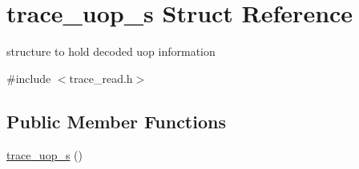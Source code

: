 \hypertarget{structtrace__uop__s}{
\section{trace\_\-uop\_\-s Struct Reference}
\label{structtrace__uop__s}
}


structure to hold decoded uop information  




{\ttfamily \#include $<$trace\_\-read.h$>$}

\subsection*{Public Member Functions}
\begin{DoxyCompactItemize}
\item 
\hyperlink{structtrace__uop__s_a9ca5a26d83c20695506e4eec07d05fe0}{trace\_\-uop\_\-s} ()
\end{DoxyCompactItemize}

